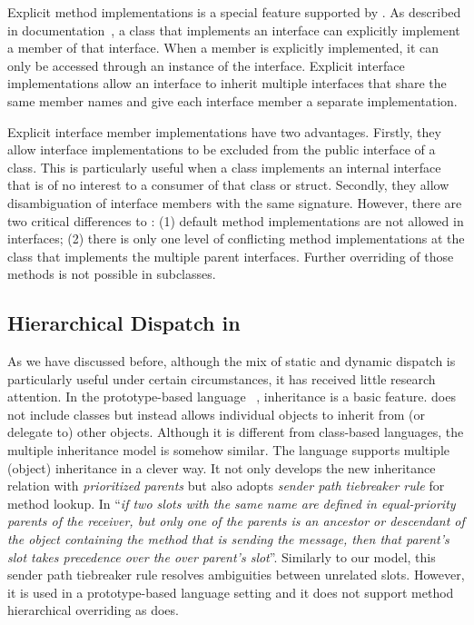 Explicit method implementations is a special feature supported by
\csharp{}. As described in \csharp{} documentation~\cite{csharpdoc}, a
class that implements an interface can explicitly implement a member
of that interface. When a member is explicitly implemented, it can
only be accessed through an instance of the interface. Explicit
interface implementations allow an interface to inherit multiple 
interfaces that share the same member names and give each interface
member a separate implementation. 

Explicit interface member implementations have two advantages.
Firstly, they allow interface implementations to be excluded 
from the public interface of a class. This is particularly useful when a class implements an internal 
interface that is of no interest to a consumer of that class or struct.
Secondly, they allow disambiguation of interface members with the 
same signature. However, there are two critical differences to \MIM{}:
(1) default method implementations are not allowed in \csharp{} interfaces; 
(2) there is only one level of conflicting method implementations at the
class that implements the multiple parent interfaces. Further
overriding of those methods is not possible in subclasses.

\subsection{Hierarchical Dispatch in \self{}}
As we have discussed before, although the mix of static and dynamic dispatch is 
particularly useful under certain circumstances, it has received little research attention. 
In the prototype-based language \self{}~\cite{Chambers1991}, inheritance is a basic feature.
\self{} does not include classes but instead allows individual objects to inherit from (or delegate to) other objects. 
Although it is different from class-based languages, the multiple inheritance model is somehow similar. The \self{}
language supports multiple (object) inheritance in a clever way. It not only develops the new inheritance
relation with \emph{prioritized parents} but also adopts \emph{sender path tiebreaker rule} for method lookup.
In \self{} ``\emph{if two slots with the same name are defined in equal-priority parents of the receiver, but only 
one of the parents is an ancestor or descendant of the object containing the method that is sending the message,
then that parent's slot takes precedence over the over parent's slot}''. 
Similarly to our model, this sender path tiebreaker rule resolves ambiguities between unrelated slots. However,
it is used in a prototype-based language setting and it does not support method hierarchical overriding as \MIM{} does.

